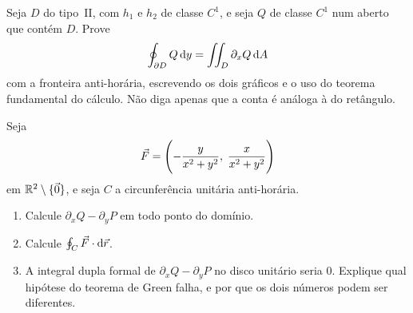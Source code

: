 \documentclass[11pt,a4paper]{article}
\begin{document}
\begin{exercicio}
Seja $D$ do tipo~II, com $h_1$ e $h_2$ de classe $C^1$, e seja $Q$ de classe $C^1$ num aberto que contém $D$. Prove
\[
\oint_{\partial D} Q\,\mathrm{d} y=\iint_D\partial_x Q\,\mathrm{d} A
\]
com a fronteira anti-horária, escrevendo os dois gráficos e o uso do teorema fundamental do cálculo. Não diga apenas que a conta é análoga à do retângulo.
\end{exercicio}

\begin{exercicio}
Seja
\[
\vec{F}=\Biggl(-\frac{y}{x^2+y^2},\;\frac{x}{x^2+y^2}\Biggr)
\]
em $\mathbb{R}^2\setminus\{\vec{0}\}$, e seja $C$ a circunferência unitária anti-horária.
\begin{enumerate}
\item Calcule $\partial_x Q-\partial_y P$ em todo ponto do domínio.
\item Calcule $\oint_C\vec{F}\cdot\mathrm{d}\vec{r}$.
\item A integral dupla formal de $\partial_x Q-\partial_y P$ no disco unitário seria $0$. Explique qual hipótese do teorema de Green falha, e por que os dois números podem ser diferentes.
\end{enumerate}
\end{exercicio}
\end{document}
